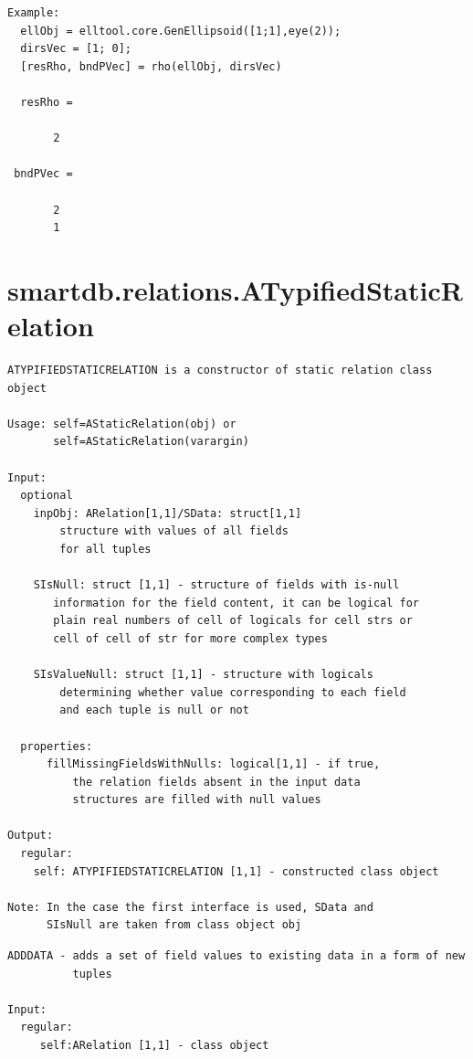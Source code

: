 \documentclass[letterpaper,10pt,english]{sphinxmanual}
\begin{document}
\begin{Verbatim}[commandchars=\\\{\}]
Example:
  ellObj = elltool.core.GenEllipsoid([1;1],eye(2));
  dirsVec = [1; 0];
  [resRho, bndPVec] = rho(ellObj, dirsVec)

  resRho =

       2

 bndPVec =

       2
       1
\end{Verbatim}


\section{smartdb.relations.ATypifiedStaticRelation}
\label{chap_func:smartdb-relations-atypifiedstaticrelation}
\begin{Verbatim}[commandchars=\\\{\}]
ATYPIFIEDSTATICRELATION is a constructor of static relation class
object

Usage: self=AStaticRelation(obj) or
       self=AStaticRelation(varargin)

Input:
  optional
    inpObj: ARelation[1,1]/SData: struct[1,1]
        structure with values of all fields
        for all tuples

    SIsNull: struct [1,1] - structure of fields with is-null
       information for the field content, it can be logical for
       plain real numbers of cell of logicals for cell strs or
       cell of cell of str for more complex types

    SIsValueNull: struct [1,1] - structure with logicals
        determining whether value corresponding to each field
        and each tuple is null or not

  properties:
      fillMissingFieldsWithNulls: logical[1,1] - if true,
          the relation fields absent in the input data
          structures are filled with null values

Output:
  regular:
    self: ATYPIFIEDSTATICRELATION [1,1] - constructed class object

Note: In the case the first interface is used, SData and
      SIsNull are taken from class object obj
\end{Verbatim}

\begin{Verbatim}[commandchars=\\\{\}]
ADDDATA - adds a set of field values to existing data in a form of new
          tuples

Input:
  regular:
     self:ARelation [1,1] - class object
\end{Verbatim}
\end{document}
